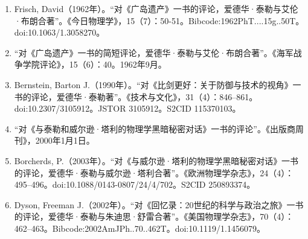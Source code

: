 \begin{enumerate}
\item Frisch, David（1962年）。“对《广岛遗产》一书的评论，爱德华·泰勒与艾伦·布朗合著”。《今日物理学》，15（7）：50-51。Bibcode:1962PhT....15g..50T。doi:10.1063/1.3058270。
\item “对《广岛遗产》一书的简短评论，爱德华·泰勒与艾伦·布朗合著”。《海军战争学院评论》，15（6）：40。1962年9月。
\item Bernstein, Barton J.（1990年）。“对《比剑更好：关于防御与技术的视角》一书的评论，爱德华·泰勒著”。《技术与文化》，31（4）：846–861。doi:10.2307/3105912。JSTOR 3105912。S2CID 115370103。
\item “对《与泰勒和威尔逊·塔利的物理学黑暗秘密对话》一书的评论”。《出版商周刊》，2000年1月1日。
\item Borcherds, P.（2003年）。“对《与威尔逊·塔利的物理学黑暗秘密对话》一书的评论，爱德华·泰勒与威尔逊·塔利合著”。《欧洲物理学杂志》，24（4）：495–496。doi:10.1088/0143-0807/24/4/702。S2CID 250893374。
\item Dyson, Freeman J.（2002年）。“对《回忆录：20世纪的科学与政治之旅》一书的评论，爱德华·泰勒与朱迪思·舒雷合著”。《美国物理学杂志》，70（4）：462–463。Bibcode:2002AmJPh..70..462T。doi:10.1119/1.1456079。
\end{enumerate}
